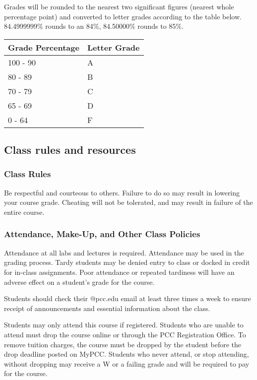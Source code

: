 \documentclass[11pt]{article}
\begin{document}
Grades will be rounded to the nearest two significant figures (nearest
whole percentage point) and converted to letter grades according to the
table below. 84.4999999\% rounds to an 84\%, 84.50000\% rounds to 85\%.

\begin{longtable}[]{@{}ll@{}}
\toprule
Grade Percentage & Letter Grade\tabularnewline
\midrule
\endhead
100 - 90 & A\tabularnewline
80 - 89 & B\tabularnewline
70 - 79 & C\tabularnewline
65 - 69 & D\tabularnewline
0 - 64 & F\tabularnewline
\bottomrule
\end{longtable}

    \hypertarget{class-rules-and-resources}{%
\subsection{Class rules and resources}\label{class-rules-and-resources}}

\hypertarget{class-rules}{%
\subsubsection{Class Rules}\label{class-rules}}

Be respectful and courteous to others. Failure to do so may result in
lowering your course grade. Cheating will not be tolerated, and may
result in failure of the entire course.

\hypertarget{attendance-make-up-and-other-class-policies}{%
\subsubsection{Attendance, Make-Up, and Other Class
Policies}\label{attendance-make-up-and-other-class-policies}}

Attendance at all labs and lectures is required. Attendance may be used
in the grading process. Tardy students may be denied entry to class or
docked in credit for in-class assignments. Poor attendance or repeated
tardiness will have an adverse effect on a student's grade for the
course.

Students should check their @pcc.edu email at least three times a week
to ensure receipt of announcements and essential information about the
class.

Students may only attend this course if registered. Students who are
unable to attend must drop the course online or through the PCC
Registration Office. To remove tuition charges, the course must be
dropped by the student before the drop deadline posted on MyPCC.
Students who never attend, or stop attending, without dropping may
receive a W or a failing grade and will be required to pay for the
course.
\end{document}
